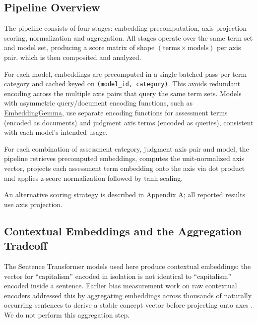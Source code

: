 \documentclass[11pt, letterpaper]{article}
\begin{document}
\subsection{Pipeline Overview}

The pipeline consists of four stages: embedding precomputation, axis projection scoring, normalization and aggregation. All stages operate over the same term set and model set, producing a score matrix of shape $(\text{terms} \times \text{models})$ per axis pair, which is then composited and analyzed.

For each model, embeddings are precomputed in a single batched pass per term category and cached keyed on \texttt{(model\_id, category)}. This avoids redundant encoding across the multiple axis pairs that query the same term sets. Models with asymmetric query/document encoding functions, such as \href{https://huggingface.co/google/embeddinggemma-300m#prompt-instructions}{EmbeddingGemma}, use separate encoding functions for assessment terms (encoded as documents) and judgment axis terms (encoded as queries), consistent with each model's intended usage.

For each combination of assessment category, judgment axis pair and model, the pipeline retrieves precomputed embeddings, computes the unit-normalized axis vector, projects each assessment term embedding onto the axis via dot product and applies z-score normalization followed by tanh scaling.

An alternative scoring strategy is described in Appendix A; all reported results use axis projection.

\subsection{Contextual Embeddings and the Aggregation Tradeoff}
\label{sec:contextual-embed}

The Sentence Transformer models used here produce contextual embeddings: the vector for ``capitalism'' encoded in isolation is not identical to ``capitalism'' encoded inside a sentence. Earlier bias measurement work on raw contextual encoders addressed this by aggregating embeddings across thousands of naturally occurring sentences to derive a stable concept vector before projecting onto axes \cite{bommasani2020,guo2021}. We do not perform this aggregation step.
\end{document}
